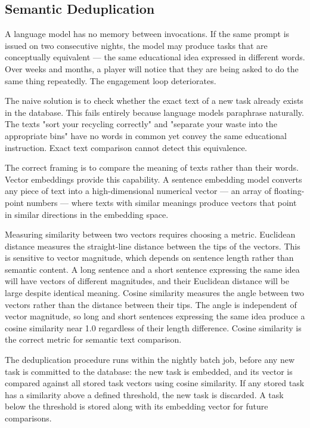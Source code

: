 \subsection{Semantic Deduplication}

A language model has no memory between invocations. If the same prompt is issued on two consecutive nights, the model may produce tasks that are conceptually equivalent --- the same educational idea expressed in different words. Over weeks and months, a player will notice that they are being asked to do the same thing repeatedly. The engagement loop deteriorates.

The naive solution is to check whether the exact text of a new task already exists in the database. This fails entirely because language models paraphrase naturally. The texts "sort your recycling correctly" and "separate your waste into the appropriate bins" have no words in common yet convey the same educational instruction. Exact text comparison cannot detect this equivalence.

The correct framing is to compare the meaning of texts rather than their words. Vector embeddings provide this capability. A sentence embedding model converts any piece of text into a high-dimensional numerical vector --- an array of floating-point numbers --- where texts with similar meanings produce vectors that point in similar directions in the embedding space.

Measuring similarity between two vectors requires choosing a metric. Euclidean distance measures the straight-line distance between the tips of the vectors. This is sensitive to vector magnitude, which depends on sentence length rather than semantic content. A long sentence and a short sentence expressing the same idea will have vectors of different magnitudes, and their Euclidean distance will be large despite identical meaning. Cosine similarity measures the angle between two vectors rather than the distance between their tips. The angle is independent of vector magnitude, so long and short sentences expressing the same idea produce a cosine similarity near 1.0 regardless of their length difference. Cosine similarity is the correct metric for semantic text comparison.

The deduplication procedure runs within the nightly batch job, before any new task is committed to the database: the new task is embedded, and its vector is compared against all stored task vectors using cosine similarity. If any stored task has a similarity above a defined threshold, the new task is discarded. A task below the threshold is stored along with its embedding vector for future comparisons.

